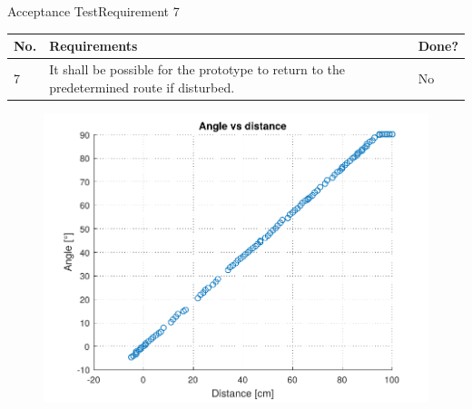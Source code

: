 
\begin{frame}{Acceptance Test}{Requirement 7}

\begin{table}[H] \centering
\begin{tabular}{|p{0.5cm}| p{7cm} |p{1cm}|}
\hline%
\textbf{No.}  &  \textbf{Requirements} & \textbf{Done?}     \\ 
\hline%
7 & It shall be possible for the prototype to return to the predetermined route if disturbed.  & No \\ \hline
\end{tabular}
\end{table}

  \pause

\begin{figure}[H]
  \centering
	\includegraphics[scale=0.5]{Pictures/AccTest7.pdf}
\end{figure}


\end{frame}



